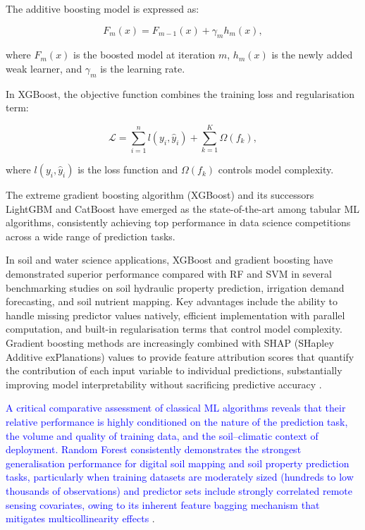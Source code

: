 \documentclass[land,article,submit,pdftex,moreauthors]{Definitions/mdpi}
\numberwithin{equation}{section}
\begin{document}
The additive boosting model is expressed as:

\begin{equation}
F_m(x)=F_{m-1}(x)+\gamma_m h_m(x),
\end{equation}

where $F_m(x)$ is the boosted model at iteration $m$, $h_m(x)$ is the newly added weak learner, and $\gamma_m$ is the learning rate.

In XGBoost, the objective function combines the training loss and regularisation term:

\begin{equation}
\mathcal{L}=
\sum_{i=1}^{n}
l(y_i,\hat{y}_i)
+
\sum_{k=1}^{K}\Omega(f_k),
\end{equation}

where $l(y_i,\hat{y}_i)$ is the loss function and $\Omega(f_k)$ controls model complexity.

The extreme gradient boosting algorithm (XGBoost) \citep{chen2016xgboost} and its successors LightGBM and CatBoost have emerged as the state-of-the-art among tabular ML algorithms, consistently achieving top performance in data science competitions across a wide range of prediction tasks.

In soil and water science applications, XGBoost and gradient boosting have demonstrated superior performance compared with RF and SVM in several benchmarking studies on soil hydraulic property prediction, irrigation demand forecasting, and soil nutrient mapping. Key advantages include the ability to handle missing predictor values natively, efficient implementation with parallel computation, and built-in regularisation terms that control model complexity. Gradient boosting methods are increasingly combined with SHAP (SHapley Additive exPlanations) values \citep{lundberg2017unified} to provide feature attribution scores that quantify the contribution of each input variable to individual predictions, substantially improving model interpretability without sacrificing predictive accuracy \citep{Lemenkova202518, Lemenkova202505}.

\textcolor{blue}{A critical comparative assessment of classical ML algorithms reveals that their relative performance is highly conditioned on the nature of the prediction task, the volume and quality of training data, and the soil--climatic context of deployment. Random Forest consistently demonstrates the strongest generalisation performance for digital soil mapping and soil property prediction tasks, particularly when training datasets are moderately sized (hundreds to low thousands of observations) and predictor sets include strongly correlated remote sensing covariates, owing to its inherent feature bagging mechanism that mitigates multicollinearity effects} \citep{hengl2017soilgrids250m}. 
\end{document}
